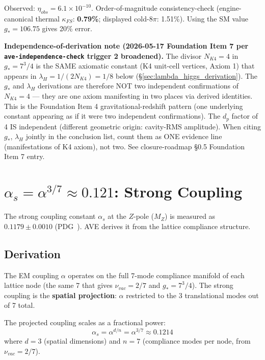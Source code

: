 Observed: $\eta_{obs} = 6.1 \times 10^{-10}$. Order-of-magnitude
consistency-check (engine-canonical thermal $\kappa_{FS}$: \textbf{0.79\%};
displayed cold-$8\pi$: 1.51\%). %
Using the SM value $g_* = 106.75$ gives 20\% error.

\textbf{Independence-of-derivation note (2026-05-17 Foundation Item 7 per \texttt{ave-independence-check} trigger 2 broadened).} The divisor $N_{K4} = 4$ in $g_* = 7^3/4$ is the SAME axiomatic constant (K4 unit-cell vertices, Axiom 1) that appears in $\lambda_H = 1/(2 N_{K4}) = 1/8$ below (\S\ref{sec:lambda_higgs_derivation}). The $g_*$ and $\lambda_H$ derivations are therefore NOT two independent confirmations of $N_{K4} = 4$ — they are one axiom manifesting in two places via derived identities. This is the Foundation Item 4 gravitational-redshift pattern (one underlying constant appearing as if it were two independent confirmations). The $d_p$ factor of 4 IS independent (different geometric origin: cavity-RMS amplitude). When citing $g_*$, $\lambda_H$ jointly in the conclusion list, count them as ONE evidence line (manifestations of K4 axiom), not two. See closure-roadmap \S0.5 Foundation Item 7 entry.

\section{$\alpha_s = \alpha^{3/7} \approx 0.121$: Strong Coupling}
\label{sec:alpha_s_derivation}

The strong coupling constant $\alpha_s$ at the $Z$-pole ($M_Z$)
is measured as $0.1179 \pm 0.0010$ (PDG~\cite{pdg2022}).  AVE derives it from
the lattice compliance structure.

\subsection{Derivation}

The EM coupling $\alpha$ operates on the full 7-mode compliance
manifold of each lattice node (the same 7 that gives $\nu_{vac} = 2/7$
and $g_* = 7^3/4$).  The strong coupling is the \textbf{spatial
projection}: $\alpha$ restricted to the 3 translational modes
out of 7 total.

The projected coupling scales as a fractional power:
\begin{equation}
    \boxed{\alpha_s = \alpha^{d/n} = \alpha^{3/7} \approx 0.1214}
\end{equation}
where $d = 3$ (spatial dimensions) and $n = 7$ (compliance modes
per node, from $\nu_{vac} = 2/7$).

